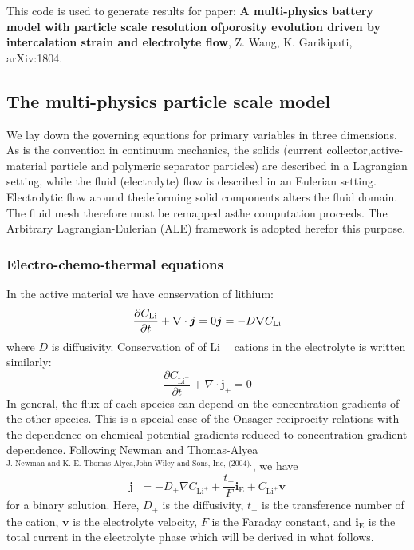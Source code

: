 This code is used to generate results for paper\-: {\bfseries A multi-\/physics battery model with particle scale resolution ofporosity evolution driven by intercalation strain and electrolyte flow}, Z. Wang, K. Garikipati, ar\-Xiv\-:1804.  \hypertarget{battery_particle_section1}{}\subsection{The multi-\/physics particle scale model}\label{battery_particle_section1}
We lay down the governing equations for primary variables in three dimensions. As is the convention in continuum mechanics, the solids (current collector,active-\/material particle and polymeric separator particles) are described in a Lagrangian setting, while the fluid (electrolyte) flow is described in an Eulerian setting. Electrolytic flow around thedeforming solid components alters the fluid domain. The fluid mesh therefore must be remapped asthe computation proceeds. The Arbitrary Lagrangian-\/\-Eulerian (A\-L\-E) framework is adopted herefor this purpose. \hypertarget{battery_particle_subsub1}{}\subsubsection{Electro-\/chemo-\/thermal equations}\label{battery_particle_subsub1}
In the active material we have conservation of lithium\-: \[ \frac{\partial C_\text{Li}}{\partial t}+\nabla\cdot\boldsymbol{j}=0\\ \boldsymbol{j}=-D\nabla C_\text{Li} \] where $D$ is diffusivity. Conservation of of Li $^+$ cations in the electrolyte is written similarly\-: \[ \frac{\partial C_{\text{Li}^+}}{\partial t}+\nabla\cdot\boldsymbol{j}_+=0 \] In general, the flux of each species can depend on the concentration gradients of the other species. This is a special case of the Onsager reciprocity relations with the dependence on chemical potential gradients reduced to concentration gradient dependence. Following Newman and Thomas-\/\-Alyea $^{\text{J. Newman and K. E. Thomas-Alyea,John Wiley and Sons, Inc, (2004).}}$, we have \[ \boldsymbol{j}_+=-D_{+}\nabla C_{\text{Li}^+} +\frac{t_+}{F}\boldsymbol{i}_\text{E}+C_{\text{Li}^+}\boldsymbol{v} \] for a binary solution. Here, $D_{+}$ is the diffusivity, $t_+$ is the transference number of the cation, $\boldsymbol{v}$ is the electrolyte velocity, $F$ is the Faraday constant, and $\boldsymbol{i}_\text{E}$ is the total current in the electrolyte phase which will be derived in what follows.

